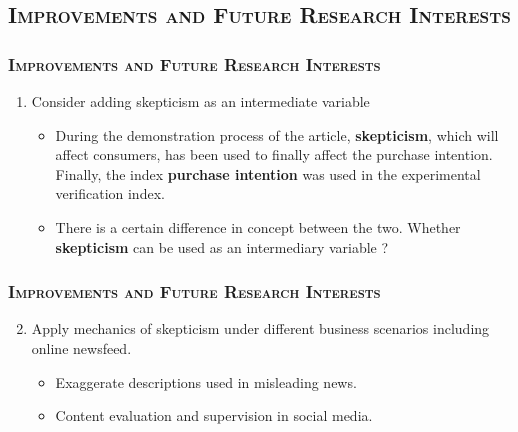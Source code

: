 \documentclass{../presentation}
\begin{document}
    \subsection{\textsc{Improvements and Future Research Interests}}

    \begin{frame}
        \frametitle{\textsc{Improvements and Future Research Interests}}

        \begin{enumerate}
            \item Consider adding skepticism as an intermediate variable
            \begin{itemize}
                \item During the demonstration process of the article, \textbf{skepticism}, which will affect consumers, has been used to finally affect the purchase intention. Finally, the index \textbf{purchase intention} was used in the experimental verification index.
                \item There is a certain difference in concept between the two. Whether \textbf{skepticism} can be used as an intermediary variable ?
            \end{itemize}
        \end{enumerate}

    \end{frame}

    \begin{frame}
        \frametitle{\textsc{Improvements and Future Research Interests}}

        \begin{enumerate}
            \setcounter{enumi}{1}
            \item Apply mechanics of skepticism under different business scenarios including online newsfeed.
            \begin{itemize}
                \item Exaggerate descriptions used in misleading news.
                \item Content evaluation and supervision in social media.
            \end{itemize}
        \end{enumerate}

    \end{frame}
\end{document}
